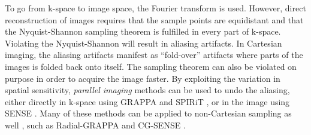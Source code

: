 To go from k-space to image space, the Fourier transform is used. However, direct reconstruction of images requires that the sample points are equidistant and that the Nyquist-Shannon sampling theorem is fulfilled in every part of k-space. Violating the Nyquist-Shannon will result in aliasing artifacts. In Cartesian imaging, the aliasing artifacts manifest as ``fold-over'' artifacts where parts of the images is folded back onto itself. The sampling theorem can also be violated on purpose in order to acquire the image faster. By exploiting the variation in spatial sensitivity, \emph{parallel imaging} methods can be used to undo the aliasing, either directly in k-space using GRAPPA \cite{Griswold2002} and SPIRiT \cite{Lustig2010}, or in the image using SENSE \cite{Pruessmann1999}. Many of these methods can be applied to non-Cartesian sampling as well \cite{Wright2014}, such as Radial-GRAPPA \cite{Seiberlich2008, Seiberlich2011} and CG-SENSE \cite{Pruessmann2001}.

